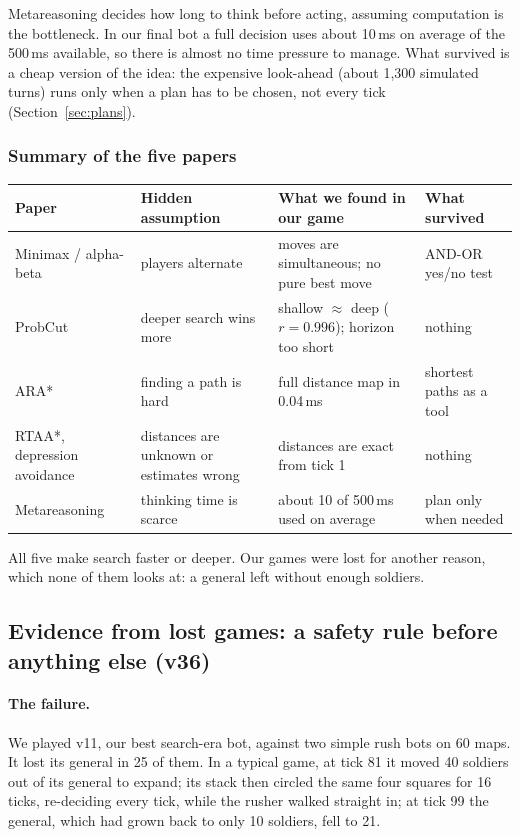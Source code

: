 Metareasoning decides how long to think before acting, assuming computation is the bottleneck. In our final bot a
full decision uses about 10\,ms on average of the 500\,ms available, so there is almost no time pressure to manage. What
survived is a cheap version of the idea: the expensive look-ahead (about 1,300 simulated turns) runs only when a
plan has to be chosen, not every tick (Section~\ref{sec:plans}).

\subsubsection{Summary of the five papers}

\begin{center}
\small
\begin{tabularx}{\linewidth}{>{\raggedright}p{2.5cm}>{\raggedright}p{3cm}>{\raggedright}X>{\raggedright\arraybackslash}p{2.6cm}}
\toprule
\textbf{Paper} & \textbf{Hidden assumption} & \textbf{What we found in our game} & \textbf{What survived}\\
\midrule
Minimax / alpha-beta & players alternate & moves are simultaneous; no pure best move & AND-OR yes/no test\\
ProbCut & deeper search wins more & shallow $\approx$ deep ($r=0.996$); horizon too short & nothing\\
ARA* & finding a path is hard & full distance map in 0.04\,ms & shortest paths as a tool\\
RTAA*, depression avoidance & distances are unknown or estimates wrong & distances are exact from tick 1 & nothing\\
Metareasoning & thinking time is scarce & about 10 of 500\,ms used on average & plan only when needed\\
\bottomrule
\end{tabularx}
\end{center}

All five make search faster or deeper. Our games were lost for another reason, which none of them looks at: a
general left without enough soldiers.

\subsection{Evidence from lost games: a safety rule before anything else (v36)}

\paragraph{The failure.} We played v11, our best search-era bot, against two simple rush bots on 60 maps. It lost
its general in 25 of them. In a typical game, at tick 81 it moved 40 soldiers out of its general to expand; its
stack then circled the same four squares for 16 ticks, re-deciding every tick, while the rusher walked straight
in; at tick 99 the general, which had grown back to only 10 soldiers, fell to 21.

